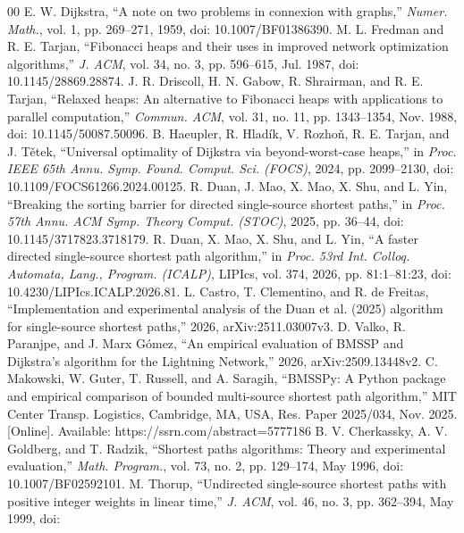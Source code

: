\documentclass[conference,a4paper]{IEEEtran}
\begin{document}
\begin{thebibliography}{00}
 E. W. Dijkstra, ``A note on two problems in connexion with graphs,''
\emph{Numer. Math.}, vol. 1, pp. 269--271, 1959, doi: 10.1007/BF01386390.
 M. L. Fredman and R. E. Tarjan, ``Fibonacci heaps and their uses in
improved network optimization algorithms,'' \emph{J. ACM}, vol. 34, no. 3, pp. 596--615, Jul.
1987, doi: 10.1145/28869.28874.
 J. R. Driscoll, H. N. Gabow, R. Shrairman, and R. E. Tarjan, ``Relaxed
heaps: An alternative to Fibonacci heaps with applications to parallel computation,''
\emph{Commun. ACM}, vol. 31, no. 11, pp. 1343--1354, Nov. 1988, doi: 10.1145/50087.50096.
 B. Haeupler, R. Hlad\'ik, V. Rozho\v{n}, R. E. Tarjan, and J. T\v{e}tek,
``Universal optimality of Dijkstra via beyond-worst-case heaps,'' in \emph{Proc. IEEE 65th Annu.
Symp. Found. Comput. Sci. (FOCS)}, 2024, pp. 2099--2130, doi: 10.1109/FOCS61266.2024.00125.
 R. Duan, J. Mao, X. Mao, X. Shu, and L. Yin, ``Breaking the sorting barrier
for directed single-source shortest paths,'' in \emph{Proc. 57th Annu. ACM Symp. Theory Comput.
(STOC)}, 2025, pp. 36--44, doi: 10.1145/3717823.3718179.
 R. Duan, X. Mao, X. Shu, and L. Yin, ``A faster directed single-source
shortest path algorithm,'' in \emph{Proc. 53rd Int. Colloq. Automata, Lang., Program. (ICALP)},
LIPIcs, vol. 374, 2026, pp. 81:1--81:23, doi: 10.4230/LIPIcs.ICALP.2026.81.
 L. Castro, T. Clementino, and R. de Freitas, ``Implementation and
experimental analysis of the Duan et al. (2025) algorithm for single-source shortest paths,''
2026, arXiv:2511.03007v3.
 D. Valko, R. Paranjpe, and J. Marx G\'omez, ``An empirical evaluation of
BMSSP and Dijkstra's algorithm for the Lightning Network,'' 2026, arXiv:2509.13448v2.
 C. Makowski, W. Guter, T. Russell, and A. Saragih, ``BMSSPy: A Python
package and empirical comparison of bounded multi-source shortest path algorithm,'' MIT Center
Transp. Logistics, Cambridge, MA, USA, Res. Paper 2025/034, Nov. 2025. [Online]. Available:
https://ssrn.com/abstract=5777186
 B. V. Cherkassky, A. V. Goldberg, and T. Radzik, ``Shortest paths
algorithms: Theory and experimental evaluation,'' \emph{Math. Program.}, vol. 73, no. 2, pp.
129--174, May 1996, doi: 10.1007/BF02592101.
 M. Thorup, ``Undirected single-source shortest paths with positive integer
weights in linear time,'' \emph{J. ACM}, vol. 46, no. 3, pp. 362--394, May 1999, doi:

\end{thebibliography}
\end{document}
